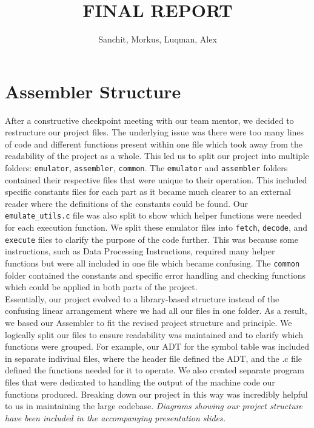 \documentclass[10pt]{article}
\begin{document}
\title{\vspace{-1cm}\textbf{FINAL REPORT}}

\date{}

\author{Sanchit, Morkus, Luqman,  Alex}

\maketitle

\section*{Assembler Structure}

After a constructive checkpoint meeting with our team mentor, we decided to restructure our project files. The underlying issue was there were too many lines of code and different functions present within one file which took away from the readability of the project as a whole. This led us to split our project into multiple folders: {\tt emulator}, {\tt assembler}, {\tt common}. The {\tt emulator} and {\tt assembler} folders contained their respective files that were unique to their operation. This included specific constants files for each part as it became much clearer to an external reader where the definitions of the constants could be found. Our {\tt emulate\_utils.c} file was also split to show which helper functions were needed for each execution function. We split these emulator files into {\tt fetch}, {\tt decode}, and {\tt execute} files to clarify the purpose of the code further. This was because some instructions, such as Data Processing Instructions, required many helper functions but were all included in one file which became confusing.  The {\tt common} folder contained the constants and specific error handling and checking functions which could be applied in both parts of the project.
\\

Essentially, our project evolved to a library-based structure instead of the confusing linear arrangement where we had all our files in one folder. As a result, we based our Assembler to fit the revised project structure and principle. We logically split our files to ensure readability was maintained and to clarify which functions were grouped. For example, our ADT for the symbol table was included in separate indiviual files, where the header file defined the ADT, and the .c file defined the functions needed for it to operate. We also created separate program files that were dedicated to handling the output of the machine code our functions produced. Breaking down our project in this way was incredibly helpful to us in maintaining the large codebase. {\sl Diagrams showing our project structure have been included in the accompanying presentation slides.}
\end{document}
